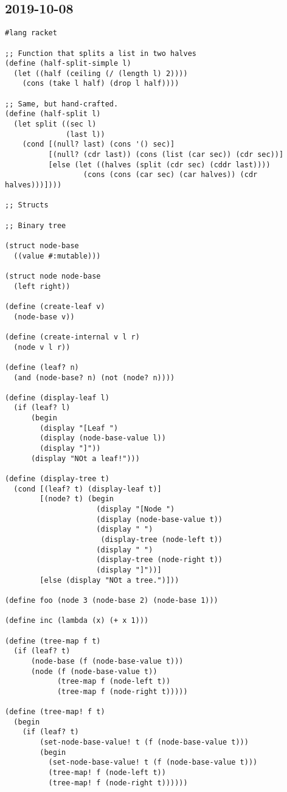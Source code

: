 \subsection{2019-10-08}
\begin{lstlisting}
#lang racket

;; Function that splits a list in two halves
(define (half-split-simple l)
  (let ((half (ceiling (/ (length l) 2))))
    (cons (take l half) (drop l half))))

;; Same, but hand-crafted.
(define (half-split l)
  (let split ((sec l)
              (last l))
    (cond [(null? last) (cons '() sec)]
          [(null? (cdr last)) (cons (list (car sec)) (cdr sec))]
          [else (let ((halves (split (cdr sec) (cddr last))))
                  (cons (cons (car sec) (car halves)) (cdr halves)))])))

;; Structs

;; Binary tree

(struct node-base
  ((value #:mutable)))

(struct node node-base
  (left right))

(define (create-leaf v)
  (node-base v))

(define (create-internal v l r)
  (node v l r))

(define (leaf? n)
  (and (node-base? n) (not (node? n))))

(define (display-leaf l)
  (if (leaf? l)
      (begin
        (display "[Leaf ")
        (display (node-base-value l))
        (display "]"))
      (display "NOt a leaf!")))

(define (display-tree t)
  (cond [(leaf? t) (display-leaf t)]
        [(node? t) (begin
                     (display "[Node ")
                     (display (node-base-value t))
                     (display " ")
                      (display-tree (node-left t))
                     (display " ")
                     (display-tree (node-right t))
                     (display "]"))]
        [else (display "NOt a tree.")]))

(define foo (node 3 (node-base 2) (node-base 1)))

(define inc (lambda (x) (+ x 1)))

(define (tree-map f t)
  (if (leaf? t)
      (node-base (f (node-base-value t)))
      (node (f (node-base-value t))
            (tree-map f (node-left t))
            (tree-map f (node-right t)))))

(define (tree-map! f t)
  (begin
    (if (leaf? t)
        (set-node-base-value! t (f (node-base-value t)))
        (begin
          (set-node-base-value! t (f (node-base-value t)))
          (tree-map! f (node-left t))
          (tree-map! f (node-right t))))))


\end{lstlisting}
